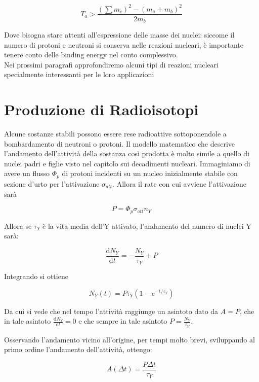 \begin{equation}
T_a>\frac{(\sum m_c)^2-(m_a+m_b)^2}{2m_b}
\end{equation}

Dove bisogna stare attenti all'espressione delle masse dei nuclei: siccome il numero di protoni e neutroni si conserva nelle reazioni nucleari, è importante tenere conto delle binding energy nel conto complessivo. \\
Nei prossimi paragrafi approfondiremo alcuni tipi di reazioni nucleari specialmente interessanti per le loro applicazioni 

\section{Produzione di Radioisotopi}

Alcune sostanze stabili possono essere rese radioattive sottoponendole a bombardamento di neutroni o protoni. Il modello matematico che descrive l'andamento dell'attività della sostanza così prodotta è molto simile a quello di nuclei padri e figlie visto nel capitolo sui decadimenti nucleari. 
Immaginiamo di avere un flusso $\Phi_p$ di protoni incidenti su un nucleo inizialmente stabile con sezione d'urto per l'attivazione $\sigma_{att}$. Allora il rate con cui avviene l'attivazione sarà

\begin{equation}
P=\Phi_p \sigma_{att} n_Y
\end{equation}

Allora se $\tau_Y$ è la vita media dell'Y attivato, l'andamento del numero di nuclei Y sarà:

\begin{equation}
\frac{\mathrm{d}N_Y}{\mathrm{d}t}=-\frac{N_Y}{\tau_Y}+P
\end{equation}

Integrando si ottiene

\begin{equation}
N_Y(t)=P\tau_Y(1-e^{-t/\tau_Y})
\end{equation}

Da cui si vede che nel tempo l'attività raggiunge un asintoto dato da $A=P$, che in tale asintoto $\frac{\mathrm{d}N_Y}{\mathrm{d}t}=0$ e che sempre in tale asintoto $P=\frac{N_Y}{\tau_Y}$.

Osservando l'andamento vicino all'origine, per tempi molto brevi, sviluppando al primo ordine l'andamento dell'attività, ottengo:

\begin{equation}
A(\Delta t)=\frac{P \Delta t}{\tau_Y}
\end{equation}

